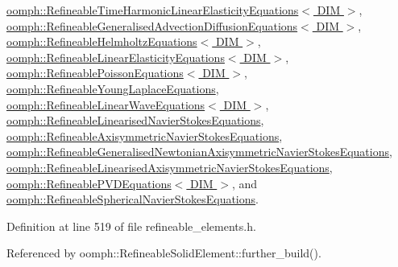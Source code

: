 \hyperlink{classoomph_1_1RefineableTimeHarmonicLinearElasticityEquations_a750d40e1fd9377cd428dfe599bf93a84}{oomph\+::\+Refineable\+Time\+Harmonic\+Linear\+Elasticity\+Equations$<$ D\+I\+M $>$}, \hyperlink{classoomph_1_1RefineableGeneralisedAdvectionDiffusionEquations_a03a7314c44b1f5a8f89bc16f8b62b5dc}{oomph\+::\+Refineable\+Generalised\+Advection\+Diffusion\+Equations$<$ D\+I\+M $>$}, \hyperlink{classoomph_1_1RefineableHelmholtzEquations_a6b58f755f6ab936ab633ecee05998899}{oomph\+::\+Refineable\+Helmholtz\+Equations$<$ D\+I\+M $>$}, \hyperlink{classoomph_1_1RefineableLinearElasticityEquations_a59edb90bae16d51048fb8401a91354a3}{oomph\+::\+Refineable\+Linear\+Elasticity\+Equations$<$ D\+I\+M $>$}, \hyperlink{classoomph_1_1RefineablePoissonEquations_adb5a117ca7556e66af8f3eeaf0bbee7a}{oomph\+::\+Refineable\+Poisson\+Equations$<$ D\+I\+M $>$}, \hyperlink{classoomph_1_1RefineableYoungLaplaceEquations_a9c663f1cb9fec2a0d5ec263313741e74}{oomph\+::\+Refineable\+Young\+Laplace\+Equations}, \hyperlink{classoomph_1_1RefineableLinearWaveEquations_ad737613ce4a9b64210bf55230d0dcf47}{oomph\+::\+Refineable\+Linear\+Wave\+Equations$<$ D\+I\+M $>$}, \hyperlink{classoomph_1_1RefineableLinearisedNavierStokesEquations_a4a160cd28d0a5a865884fd9f27254a2d}{oomph\+::\+Refineable\+Linearised\+Navier\+Stokes\+Equations}, \hyperlink{classoomph_1_1RefineableAxisymmetricNavierStokesEquations_a9e0d4b625595604ff1297b4c86a011bd}{oomph\+::\+Refineable\+Axisymmetric\+Navier\+Stokes\+Equations}, \hyperlink{classoomph_1_1RefineableGeneralisedNewtonianAxisymmetricNavierStokesEquations_af800c46aa82a7188565d68df5aee6fa0}{oomph\+::\+Refineable\+Generalised\+Newtonian\+Axisymmetric\+Navier\+Stokes\+Equations}, \hyperlink{classoomph_1_1RefineableLinearisedAxisymmetricNavierStokesEquations_aed7750eee08d103a6872b4ef882c24cd}{oomph\+::\+Refineable\+Linearised\+Axisymmetric\+Navier\+Stokes\+Equations}, \hyperlink{classoomph_1_1RefineablePVDEquations_a936bab952ddbad5093cb7ee80d0019b5}{oomph\+::\+Refineable\+P\+V\+D\+Equations$<$ D\+I\+M $>$}, and \hyperlink{classoomph_1_1RefineableSphericalNavierStokesEquations_acb7ba9bdf812cecd8d1d503000227856}{oomph\+::\+Refineable\+Spherical\+Navier\+Stokes\+Equations}.



Definition at line 519 of file refineable\+\_\+elements.\+h.



Referenced by oomph\+::\+Refineable\+Solid\+Element\+::further\+\_\+build().

\mbox{\label{classoomph_1_1RefineableElement_a86ea01c485f7ff822dce74b884312ccb}} 
